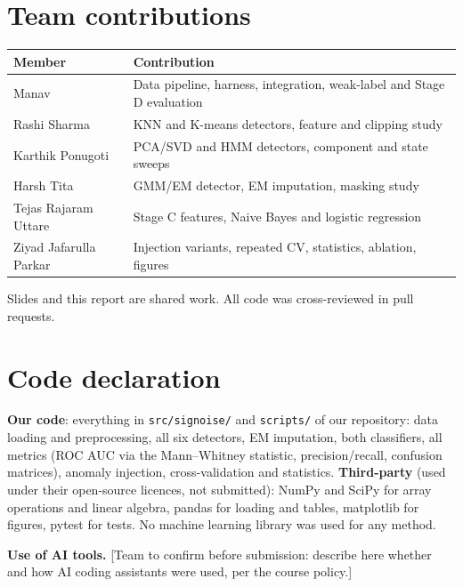 \documentclass[11pt]{article}
\begin{document}
\section*{Team contributions}
\begin{tabular}{ll}
\toprule
Member & Contribution\\
\midrule
Manav & Data pipeline, harness, integration, weak-label and Stage D evaluation\\
Rashi Sharma & KNN and K-means detectors, feature and clipping study\\
Karthik Ponugoti & PCA/SVD and HMM detectors, component and state sweeps\\
Harsh Tita & GMM/EM detector, EM imputation, masking study\\
Tejas Rajaram Uttare & Stage C features, Naive Bayes and logistic regression\\
Ziyad Jafarulla Parkar & Injection variants, repeated CV, statistics, ablation, figures\\
\bottomrule
\end{tabular}

Slides and this report are shared work. All code was cross-reviewed in pull requests.

\section*{Code declaration}
\textbf{Our code}: everything in \texttt{src/signoise/} and \texttt{scripts/} of our repository: data loading and preprocessing, all six detectors, EM imputation, both classifiers, all metrics (ROC AUC via the Mann--Whitney statistic, precision/recall, confusion matrices), anomaly injection, cross-validation and statistics. \textbf{Third-party} (used under their open-source licences, not submitted): NumPy and SciPy for array operations and linear algebra, pandas for loading and tables, matplotlib for figures, pytest for tests. No machine learning library was used for any method.

\textbf{Use of AI tools.} [Team to confirm before submission: describe here whether and how AI coding assistants were used, per the course policy.]
\end{document}
